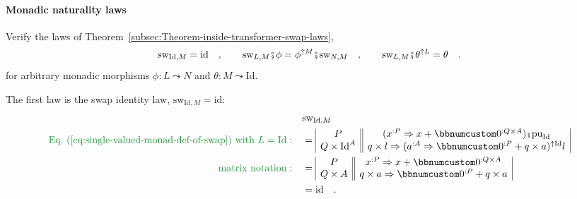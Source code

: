 \paragraph{Monadic naturality laws}

Verify the laws of Theorem~\ref{subsec:Theorem-inside-transformer-swap-laws},
\[
\text{sw}_{\text{Id},M}=\text{id}\quad,\quad\quad\text{sw}_{L,M}\bef\phi=\phi^{\uparrow M}\bef\text{sw}_{N,M}\quad,\quad\quad\text{sw}_{L,M}\bef\theta^{\uparrow L}=\theta\quad.
\]
for arbitrary monadic morphisms $\phi:L\leadsto N$ and $\theta:M\leadsto\text{Id}$.

The first law is the swap identity law, $\text{sw}_{\text{Id},M}=\text{id}$:
\begin{align*}
 & \text{sw}_{\text{Id},M}\\
{\color{greenunder}\text{Eq.~(\ref{eq:single-valued-monad-def-of-swap}) with }L=\text{Id}:}\quad & =\begin{array}{|c||c|}
P & (x^{:P}\Rightarrow x+\bbnum 0^{:Q\times A})\bef\text{pu}_{\text{Id}}\\
Q\times\text{Id}^{A} & q\times l\Rightarrow(a^{:A}\Rightarrow\bbnum 0^{:P}+q\times a)^{\uparrow\text{Id}}l
\end{array}\\
{\color{greenunder}\text{matrix notation}:}\quad & =\begin{array}{|c||c|}
P & x^{:P}\Rightarrow x+\bbnum 0^{:Q\times A}\\
Q\times A & q\times a\Rightarrow\bbnum 0^{:P}+q\times a
\end{array}\\
 & =\text{id}\quad.
\end{align*}

